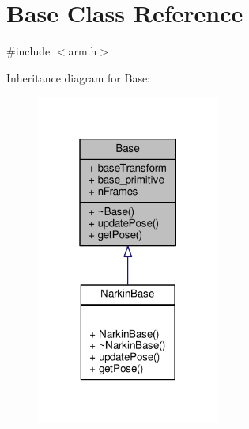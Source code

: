 \hypertarget{class_base}{}\section{Base Class Reference}
\label{class_base}


{\ttfamily \#include $<$arm.\+h$>$}



Inheritance diagram for Base\+:
\nopagebreak
\begin{figure}[H]
\begin{center}
\leavevmode
\includegraphics[width=171pt]{class_base__inherit__graph}
\end{center}
\end{figure}


